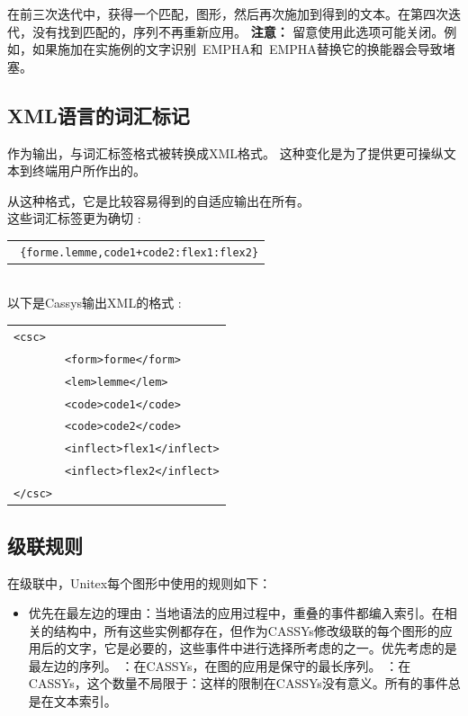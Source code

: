\bigskip
在前三次迭代中，获得一个匹配，图形，然后再次施加到得到的文本。在第四次迭代，没有找到匹配的，序列不再重新应用。
\bigskip
\large{\textbf{注意：}} 留意使用此选项可能关闭。例如，如果施加在实施例的文字识别\ EMPH{A}和\ EMPH{A}替换它的换能器会导致堵塞。


\subsection{XML语言的词汇标记}

作为输出，与词汇标签格式被转换成XML格式。
这种变化是为了提供更可操纵文本到终端用户所作出的。

从这种格式，它是比较容易得到的自适应输出在所有。\\

这些词汇标签更为确切 :\\
\begin{tabular}{c}
\texttt{
\{forme.lemme,code1+code2:flex1:flex2\}}
\end{tabular}\\

以下是Cassys输出XML的格式 :\\
\begin{tabular}{ll}
\texttt{<csc>}&\\
	&\texttt{<form>forme</form>}\\
	&\texttt{<lem>lemme</lem>}\\
	&\texttt{<code>code1</code>}\\
	&\texttt{<code>code2</code>}\\
	&\texttt{<inflect>flex1</inflect>}\\
	&\texttt{<inflect>flex2</inflect>}\\
\texttt{</csc>}&\\
\end{tabular}


\subsection{级联规则}

在级联中，Unitex每个图形中使用的规则如下：
\begin{itemize}
	：在“合并”模式，输出所插入的识别序列的左边。	\item	优先在最左边的理由：当地语法的应用过程中，重叠的事件都编入索引。在相关的结构中，所有这些实例都存在，但作为CASSYs修改级联的每个图形的应用后的文字，它是必要的，这些事件中进行选择所考虑的之一。优先考虑的是最左边的序列。
	：在CASSYs，在图的应用是保守的最长序列。
	：在CASSYs，这个数量不局限于：这样的限制在CASSYs没有意义。所有的事件总是在文本索引。
\end{itemize}

